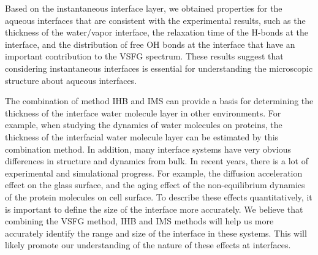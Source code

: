Based on the instantaneous interface layer, we obtained properties for the aqueous interfaces that are consistent with the experimental results, 
such as the thickness of the water/vapor interface, the relaxation time of the H-bonds at the interface, 
and the distribution of free OH bonds at the interface that have an important contribution to the VSFG spectrum.
These results suggest that considering instantaneous interfaces is essential for understanding the microscopic structure about aqueous interfaces.

The combination of method IHB and IMS can provide a basis for determining the thickness of the interface water molecule layer in other environments. 
For example, when studying the dynamics of water molecules on proteins, the thickness of the interfacial water molecule layer can be estimated by this combination method.
In addition, many interface systems have very obvious differences in structure and dynamics from bulk.
In recent years, there is a lot of experimental and simulational progress. For example, the diffusion acceleration effect on the glass surface\cite{ZhuL11,ZhangWei16}, 
and the aging effect of the non-equilibrium dynamics of the protein molecules on cell surface\cite{HuXiaohu16}. 
To describe these effects quantitatively, it is important to define the size of the interface more accurately. 
We believe that combining the VSFG method, IHB and IMS methods will help us more accurately identify the range and size of the interface in these systems.
This will likely promote our understanding of the nature of these effects at interfaces.



